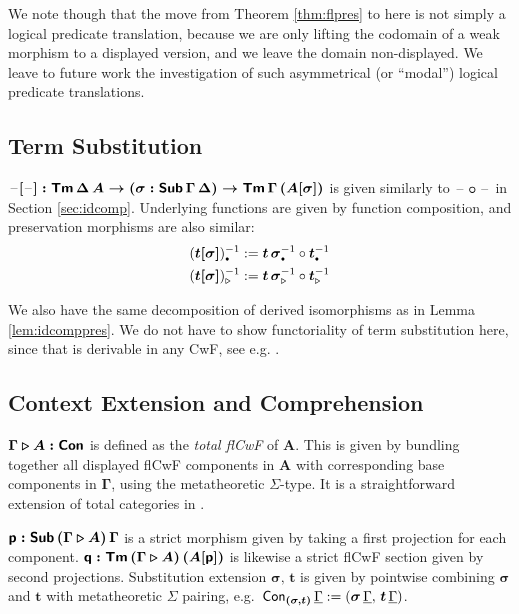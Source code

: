\documentclass[sigplan,review,anonymous]{acmart}\settopmatter{printfolios=true,printccs=false,printacmref=false}
\newcommand{\ext}{\triangleright}
\newcommand{\emptycon}{\scaleobj{.75}\bullet}
\newcommand{\p}{\mathsf{p}}
\newcommand{\q}{\mathsf{q}}
\newcommand{\bGamma}{\boldsymbol{\Gamma}}
\newcommand{\bsigma}{\boldsymbol{\sigma}}
\newcommand{\bt}{\boldsymbol{t}}
\newcommand{\bA}{\boldsymbol{A}}
\newcommand{\ul}[1]{\underline{#1}}
\newcommand{\ulGamma}{\ul{\Gamma}}
\begin{document}
We note though that the move from Theorem \ref{thm:flpres} to here is not simply a
logical predicate translation, because we are only lifting the codomain of a
weak morphism to a displayed version, and we leave the domain non-displayed. We
leave to future work the investigation of such asymmetrical (or
``modal'') logical predicate translations.

\subsection{Term Substitution}

$\boldsymbol{\mathord{\hspace{1pt}\text{--}\hspace{1pt}}[\mathord{\hspace{1pt}\text{--}\hspace{1pt}}] : \mathsf{Tm}\,\Delta\,A \rightarrow (\sigma : \mathsf{Sub}\,\Gamma\,\Delta)
  \rightarrow \mathsf{Tm}\,\Gamma\,(A[\sigma])}$ is given similarly to
$\boldsymbol{\mathord{\hspace{1pt}\text{--}\hspace{1pt}}\circ\mathord{\hspace{1pt}\text{--}\hspace{1pt}}}$ in Section \ref{sec:idcomp}. Underlying functions
are given by function composition, and preservation morphisms are also similar:
\begin{alignat*}{3}
  & (\boldsymbol{t[\sigma]})_{\emptycon}^{-1} :=
    \bt\,\bsigma_{\emptycon}^{-1} \circ \bt_{\emptycon}^{-1} \\
  & (\boldsymbol{t[\sigma]})_{\ext}^{-1} :=
    \bt\,\bsigma_{\ext}^{-1} \circ \bt_{\ext}^{-1}
\end{alignat*}

We also have the same decomposition of derived isomorphisms as in Lemma
\ref{lem:idcomppres}. We do not have to show functoriality of term substitution
here, since that is derivable in any CwF, see e.g. \cite{kaposi2019constructing}.

\subsection{Context Extension and Comprehension}

$\boldsymbol{\Gamma \ext A : \Con}$ is defined as the \emph{total flCwF} of
$\bA$. This is given by bundling together all displayed flCwF components in
$\bA$ with corresponding base components in $\bGamma$, using the metatheoretic
$\Sigma$-type. It is a straightforward extension of total categories in
\cite{displayedcats}.

$\boldsymbol{\p : \Sub\,(\Gamma\ext A)\,\Gamma}$ is a strict morphism given by
taking a first projection for each component. $\boldsymbol{\q : \Tm\,(\Gamma\ext
  A)\,(A[\p])}$ is likewise a strict flCwF section given by second projections. Substitution extension $\boldsymbol{\sigma,\,t}$ is given by pointwise combining $\bsigma$ and $\bt$ with metatheoretic $\Sigma$ pairing, e.g.\ $\Con_{\boldsymbol{(\sigma,t)}}\,\ulGamma := (\bsigma\,\ulGamma,\,\bt\,\ulGamma)$.
\end{document}
